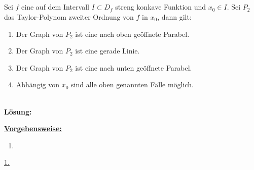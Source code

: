 \newpage
\subsection*{}
Sei $f$ eine auf dem Intervall $I \subset D_f$ streng konkave Funktion und $x_0 \in I$. Sei $P_2 $ das Taylor-Polynom zweiter Ordnung von $f$ in $x_0$, dann gilt:
\renewcommand{\labelenumi}{(\alph{enumi})}
\begin{enumerate}
	\item 
	Der Graph von $P_2$ ist eine nach oben geöffnete Parabel.
	\item
	Der Graph von $P_2$ ist eine gerade Linie.
	\item
	Der Graph von $P_2$ ist eine nach unten geöffnete Parabel.
	\item
	Abhängig von $x_0$ sind alle oben genannten Fälle möglich.
\end{enumerate}
\ \\
\textbf{Lösung:}
\begin{mdframed}
	\underline{\textbf{Vorgehensweise:}}
	\renewcommand{\labelenumi}{\theenumi.}
	\begin{enumerate}
		\item 
	\end{enumerate}
\end{mdframed}

\underline{1. }\\


